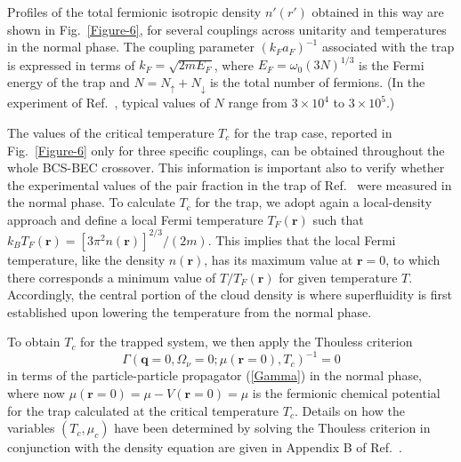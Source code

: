 \documentclass[pra,twocolumn,aps,amssymb,showpacs,superscriptaddress]{revtex4-1}
\begin{document}
Profiles of the total fermionic isotropic density $n'(r')$ obtained in this way are shown in Fig.~\ref{Figure-6}, for several couplings across unitarity and temperatures in the normal phase.
The coupling parameter $(k_{F} a_{F})^{-1}$ associated with the trap is expressed in terms of $k_{F} = \sqrt{2 m E_{F}}$, where $E_{F} = \omega_{0} (3N)^{1/3}$ is the Fermi energy of the trap and $N=N_{\uparrow}+N_{\downarrow}$ is the total number of fermions.
(In the experiment of Ref.~\cite{Ulm-Cam-2019}, typical values of $N$ range from $3 \times 10^4$ to $3 \times 10^5$.)

The values of the critical temperature $T_{c}$ for the trap case, reported in Fig.~\ref{Figure-6} only for three specific couplings, can be obtained throughout the whole BCS-BEC crossover.
This information is important also to verify whether the experimental values of the pair fraction in the trap of Ref.~\cite{Ulm-Cam-2019} were measured in the normal phase.
To calculate $T_{c}$ for the trap, we adopt again a local-density approach and define a local Fermi temperature $T_{F}(\mathbf{r})$ such that 
$k_{B} T_{F}(\mathbf{r}) = \left[ 3 \pi^{2} n(\mathbf{r})\right]^{2/3}\!/(2m)$.
This implies that the local Fermi temperature, like the density $n(\mathbf{r})$, has its maximum value at $\mathbf{r}=0$, to which there corresponds a minimum value of $T/T_{F}(\mathbf{r})$ for given temperature $T$.
Accordingly, the central portion of the cloud density is where superfluidity is first established upon lowering the temperature from the normal phase.

To obtain $T_{c}$ for the trapped system, we then apply the Thouless criterion
\begin{equation}
\Gamma \left( \mathbf{q}=0,\Omega_{\nu}=0;\mu(\mathbf{r}=0),T_{c} \right)^{-1} = 0
\label{local-Thouless-criterion}
\end{equation}
in terms of the particle-particle propagator (\ref{Gamma}) in the normal phase, where now $\mu(\mathbf{r}=0) = \mu - V(\mathbf{r}=0) = \mu$ is the fermionic chemical potential for the trap calculated
at the critical temperature $T_{c}$.
Details on how the variables $(T_{c},\mu_{c})$ have been determined by solving the Thouless criterion in conjunction with the density equation are given in Appendix B of Ref.~\cite{PPS-2019}.
\end{document}
